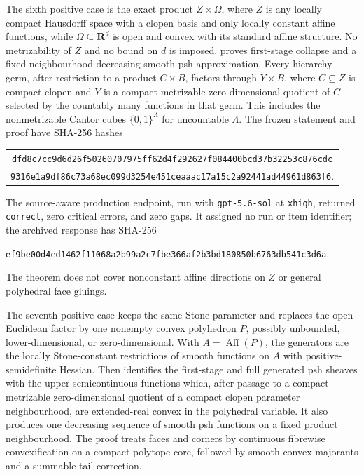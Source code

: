 The sixth positive case is the exact product \(Z\times\Omega\), where \(Z\)
is any locally compact Hausdorff space with a clopen basis and only locally
constant affine functions, while
\(\Omega\subseteq\mathbf R^d\) is open and convex with its standard affine
structure.  No metrizability of \(Z\) and no bound on \(d\) is imposed.
 proves first-stage collapse and a
fixed-neighbourhood decreasing smooth-psh approximation.  Every hierarchy
germ, after restriction to a product \(C\times B\), factors through
\(Y\times B\), where \(C\subseteq Z\) is compact clopen and \(Y\) is a compact
metrizable zero-dimensional quotient of \(C\) selected by the countably many
functions in that germ.  This includes the nonmetrizable Cantor cubes
\(\{0,1\}^{\Lambda}\) for uncountable \(\Lambda\).  The frozen statement and
proof have SHA-256 hashes
\begin{center}
\small
\begin{tabular}{@{}c@{}}
\nolinkurl{dfd8c7cc9d6d26f50260707975ff62d4f292627f084400bcd37b32253c876cdc}\\
\nolinkurl{9316e1a9df86c73a68ec099d3254e451ceaaac17a15c2a92441ad44961d863f6}.
\end{tabular}
\end{center}
The source-aware production endpoint, run with \texttt{gpt-5.6-sol} at
\texttt{xhigh}, returned \texttt{correct}, zero critical errors, and zero
gaps.  It assigned no run or item identifier; the archived response has
SHA-256
\begin{center}
\small
\nolinkurl{ef9be00d4ed1462f11068a2b99a2c7fbe366af2b3bd180850b6763db541c3d6a}.
\end{center}
The theorem does not cover nonconstant affine directions on \(Z\) or general
polyhedral face gluings.

The seventh positive case keeps the same Stone parameter and replaces the
open Euclidean factor by one nonempty convex polyhedron \(P\), possibly
unbounded, lower-dimensional, or zero-dimensional.  With
\(A=\operatorname{Aff}(P)\), the generators are the locally
Stone-constant restrictions of smooth functions on \(A\) with
positive-semidefinite Hessian.  Then
 identifies the first-stage and
full generated psh sheaves with the upper-semicontinuous functions which,
after passage to a compact metrizable zero-dimensional quotient of a compact
clopen parameter neighbourhood, are extended-real convex in the
polyhedral variable.  It also produces one decreasing sequence of smooth
psh functions on a fixed product neighbourhood.  The proof treats faces and
corners by continuous fibrewise convexification on a compact polytope core,
followed by smooth convex majorants and a summable tail correction.


